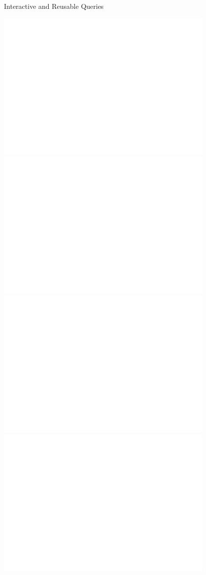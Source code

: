 \documentclass{beamer}
\begin{document}
\begin{frame}{Interactive and Reusable Queries}
\begin{overprint}
 \includegraphics[width=0.8\textwidth]{allq1}
 \includegraphics[width=0.8\textwidth]{allq2}
 \includegraphics[width=0.8\textwidth]{allq3}
 \includegraphics[width=0.8\textwidth]{allq4}
\end{overprint}
\end{frame}
\end{document}
